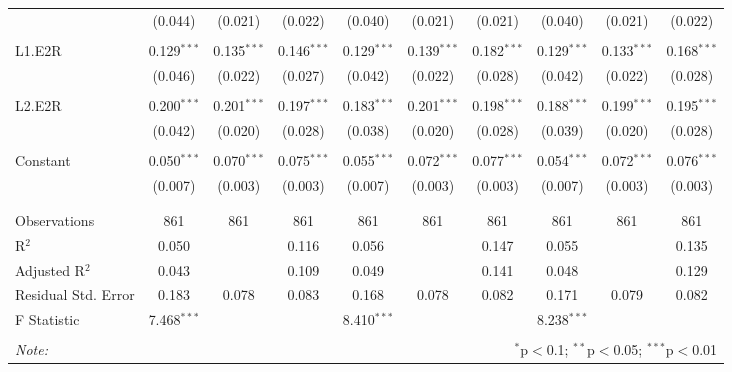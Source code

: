 \begin{table}[!htbp]
\begin{tabular}{@{\extracolsep{5pt}}lccccccccc}
  & (0.044) & (0.021) & (0.022) & (0.040) & (0.021) & (0.021) & (0.040) & (0.021) & (0.022) \\ 
  & & & & & & & & & \\ 
 L1.E2R & 0.129$^{***}$ & 0.135$^{***}$ & 0.146$^{***}$ & 0.129$^{***}$ & 0.139$^{***}$ & 0.182$^{***}$ & 0.129$^{***}$ & 0.133$^{***}$ & 0.168$^{***}$ \\ 
  & (0.046) & (0.022) & (0.027) & (0.042) & (0.022) & (0.028) & (0.042) & (0.022) & (0.028) \\ 
  & & & & & & & & & \\ 
 L2.E2R & 0.200$^{***}$ & 0.201$^{***}$ & 0.197$^{***}$ & 0.183$^{***}$ & 0.201$^{***}$ & 0.198$^{***}$ & 0.188$^{***}$ & 0.199$^{***}$ & 0.195$^{***}$ \\ 
  & (0.042) & (0.020) & (0.028) & (0.038) & (0.020) & (0.028) & (0.039) & (0.020) & (0.028) \\ 
  & & & & & & & & & \\ 
 Constant & 0.050$^{***}$ & 0.070$^{***}$ & 0.075$^{***}$ & 0.055$^{***}$ & 0.072$^{***}$ & 0.077$^{***}$ & 0.054$^{***}$ & 0.072$^{***}$ & 0.076$^{***}$ \\ 
  & (0.007) & (0.003) & (0.003) & (0.007) & (0.003) & (0.003) & (0.007) & (0.003) & (0.003) \\ 
  & & & & & & & & & \\ 
\hline \\[-1.8ex] 
Observations & 861 & 861 & 861 & 861 & 861 & 861 & 861 & 861 & 861 \\ 
R$^{2}$ & 0.050 &  & 0.116 & 0.056 &  & 0.147 & 0.055 &  & 0.135 \\ 
Adjusted R$^{2}$ & 0.043 &  & 0.109 & 0.049 &  & 0.141 & 0.048 &  & 0.129 \\ 
Residual Std. Error & 0.183 & 0.078 & 0.083 & 0.168 & 0.078 & 0.082 & 0.171 & 0.079 & 0.082 \\ 
F Statistic & 7.468$^{***}$ &  &  & 8.410$^{***}$ &  &  & 8.238$^{***}$ &  &  \\ 
\hline 
\hline \\[-1.8ex] 
\textit{Note:}  & \multicolumn{9}{r}{$^{*}$p$<$0.1; $^{**}$p$<$0.05; $^{***}$p$<$0.01} \\ 
\end{tabular} 
\end{table} 
